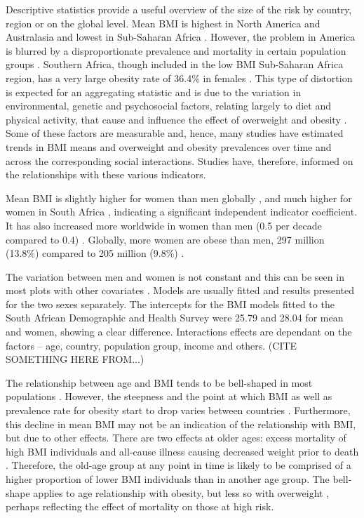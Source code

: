 \documentclass[12pt,a4paper]{article}
\begin{document}
Descriptive statistics provide a useful overview of the size of the risk by country, region or on the global level. Mean BMI is highest in North America and Australasia and lowest in Sub-Saharan Africa \citep{stevens11}. However, the problem in America is blurred by a disproportionate prevalence and mortality in certain population groups \citep{ladabaum2014}. Southern Africa, though included in the low BMI Sub-Saharan Africa region, has a very large obesity rate of 36.4\% in females \citep{stevens12}. This type of distortion is expected for an aggregating statistic and is due to the variation in environmental, genetic and psychosocial factors, relating largely to diet and physical activity, that cause and influence the effect of overweight and obesity \citep{kopelman2000, haslam05}. Some of these factors are measurable \citep{ezzati02} and, hence, many studies have estimated trends in BMI means and overweight and obesity prevalences over time and across the corresponding social interactions. Studies have, therefore, informed on the relationships with these various indicators.

Mean BMI is slightly higher for women than men globally \citep{stevens11}, and much higher for women in South Africa \citep{bradshaw}, indicating a significant independent indicator coefficient. It has also increased more worldwide in women than men (0.5 per decade compared to 0.4) \citep{stevens11}. Globally, more women are obese than men, 297 million (13.8\%) compared to 205 million (9.8\%) \citep{stevens11}. 

The variation between men and women is not constant and this can be seen in most plots with other covariates \citep{ezzati05, stevens12,oecd}. Models are usually fitted and results presented for the two sexes separately. The intercepts for the BMI models fitted to the South African Demographic and Health Survey were 25.79 and 28.04 for mean and women, showing a clear difference. Interactions effects are dependant on the factors -- age, country, population group, income and others. (CITE SOMETHING HERE FROM...)

The relationship between age and BMI tends to be bell-shaped in most populations \citep{oecd}. However, the steepness and the point at which BMI as well as prevalence rate for obesity start to drop varies between countries \citep{stevens11}. Furthermore, this decline in mean BMI may not be an indication of the relationship with BMI, but due to other effects. There are two effects at older ages: excess mortality of high BMI individuals and all-cause illness causing decreased weight prior to death \citep{willett99}. Therefore, the old-age group at any point in time is likely to be comprised of a higher proportion of lower BMI individuals than in another age group. The bell-shape applies to age relationship with obesity, but less so with overweight \citep{oecd}, perhaps reflecting the effect of mortality on those at high risk.
\end{document}
